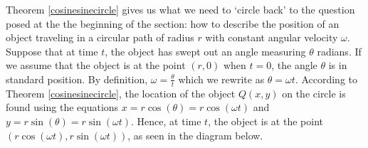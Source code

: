 \documentclass{ximera}
\begin{document}
Theorem \ref{cosinesinecircle} gives us what we need to `circle back' to the question posed at the the beginning of the section:  how to describe the position of an object traveling in a circular path of radius $r$ with constant angular velocity $\omega$.  Suppose that at time $t$, the object has swept out an angle measuring $\theta$ radians.  If we assume that the object is at the point $(r,0)$ when $t=0$, the angle $\theta$ is in standard position.  By definition, $\omega = \frac{\theta}{t}$ which we rewrite as  $\theta = \omega t$.  According to Theorem \ref{cosinesinecircle}, the location of the object $Q(x,y)$ on the circle is found using the equations  $x = r \cos(\theta) = r \cos(\omega t)$ and $y = r \sin(\theta) = r \sin(\omega t)$.  Hence, at time $t$, the object is at the point $(r \cos(\omega t), r \sin(\omega t))$, as seen in the diagram below.



\begin{image}
\end{image}
\end{document}
